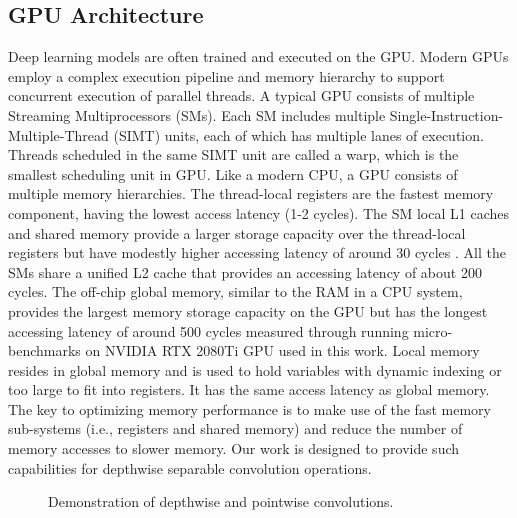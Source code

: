 \subsection{GPU Architecture\label{sec:ga}}
Deep learning models are often trained and executed on the GPU. Modern GPUs employ a complex execution pipeline and memory hierarchy to
support concurrent execution of parallel threads. A typical GPU consists of multiple Streaming Multiprocessors (SMs). Each SM includes
multiple Single-Instruction-Multiple-Thread (SIMT) units, each of which has multiple lanes of execution. Threads scheduled in the same SIMT
unit are called a warp, which is the smallest scheduling unit in GPU. Like a modern CPU, a GPU consists of multiple memory hierarchies. The
thread-local registers are the fastest memory component, having the lowest access latency (1-2 cycles). The SM local L1 caches and shared
memory provide a larger storage capacity over the thread-local registers but have modestly higher accessing latency of around 30 cycles
\cite{mei2016dissecting,jia2018dissecting}. All the SMs share a unified L2 cache that provides an accessing latency of about 200 cycles.
The off-chip global memory, similar to the RAM in a CPU system, provides the largest memory storage capacity on the GPU but has the longest
accessing latency of around 500 cycles measured through running micro-benchmarks on NVIDIA RTX 2080Ti GPU used in this work. Local memory
resides in global memory and is used to hold variables with dynamic indexing or too large to fit into registers. It has the same access
latency as global memory. The key to optimizing memory performance is to make use of the fast memory sub-systems (i.e., registers and
shared memory) and reduce the number of memory accesses to slower memory. Our work is designed to provide such capabilities for depthwise
separable convolution operations.
\begin{figure}[t!]
\centering
{}
\vspace{1em}
\caption{Demonstration of depthwise and pointwise convolutions.}
  \label{fig:depsepconv}
\end{figure}

